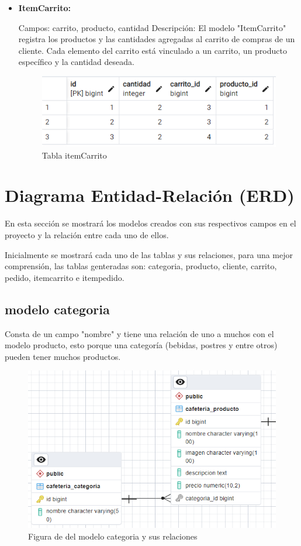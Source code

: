 \documentclass{article}
\begin{document}
\begin{itemize}
        \newpage
		\item \textbf{ItemCarrito:}
		
	Campos: carrito, producto, cantidad
	Descripción: El modelo "ItemCarrito" registra los productos y las cantidades agregadas al carrito de compras de un cliente. Cada elemento del carrito está vinculado a un carrito, un producto específico y la cantidad deseada.
	\begin{figure}[h!]
		\centering
		\includegraphics[width=.75\linewidth]{img/titemcarrito}
		\caption{Tabla itemCarrito}
		\label{fig:titemcarrito}
	\end{figure}
	
	\end{itemize}
		
	\section{Diagrama Entidad-Relación (ERD)}
	En esta sección se mostrará los modelos creados con sus respectivos campos en el proyecto y la relación entre cada uno de ellos.
	
	Inicialmente se mostrará cada uno de las tablas y sus relaciones, para una mejor comprensión, las tablas genteradas son: categoria, producto, cliente, carrito, pedido, itemcarrito e itempedido.
	
	\subsection{modelo categoria}
	Consta de un campo "nombre" y tiene una relación de uno a muchos con el modelo producto, esto porque una categoría (bebidas, postres y entre otros) pueden tener muchos productos.
	\begin{figure}[h!]
		\centering
		\includegraphics[width=.7\linewidth]{img/modCategoria}
		\caption{Figura de del modelo categoria y sus relaciones}
		\label{fig:modcategoria}
	\end{figure}
	
\end{document}
